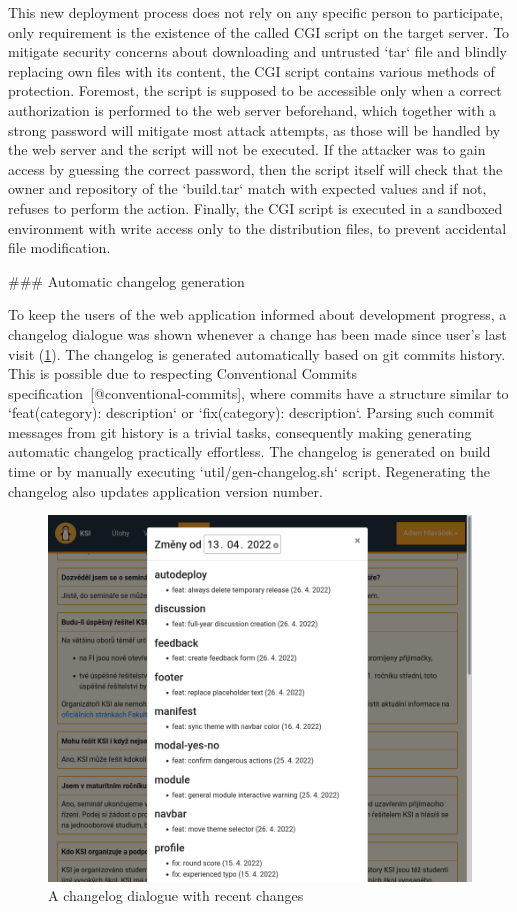 \documentclass[
  digital, %
  oneside, %
  lof,     %
  lot,     %
]{fithesis4}
\begin{document}
{This new deployment process does not rely on any specific person to participate, only requirement is the existence of the called CGI script on the target server. To mitigate security concerns about downloading and untrusted `tar` file and blindly replacing own files with its content, the CGI script contains various methods of protection. Foremost, the script is supposed to be accessible only when a correct authorization is performed to the web server beforehand, which together with a strong password will mitigate most attack attempts, as those will be handled by the web server and the script will not be executed. If the attacker was to gain access by guessing the correct password, then the script itself will check that the owner and repository of the `build.tar` match with expected values and if not, refuses to perform the action. Finally, the CGI script is executed in a sandboxed environment with write access only to the distribution files, to prevent accidental file modification.

### Automatic changelog generation
\label{chap:changelog}

To keep the users of the web application informed about development progress, a changelog dialogue was shown whenever a change has been made since user's last visit (\ref{fig:changelog}). The changelog is generated automatically based on git commits history. This is possible due to respecting Conventional Commits specification~[@conventional-commits], where commits have a structure similar to `feat(category): description` or `fix(category): description`. Parsing such commit messages from git history is a trivial tasks, consequently making generating automatic changelog practically effortless. The changelog is generated on build time or by manually executing `util/gen-changelog.sh` script. Regenerating the changelog also updates application version number.

\begin{figure}
\includegraphics[width=\textwidth]{assets/img/changelog}
\caption{A changelog dialogue with recent changes}
\label{fig:changelog}
\end{figure}

}
\end{document}

